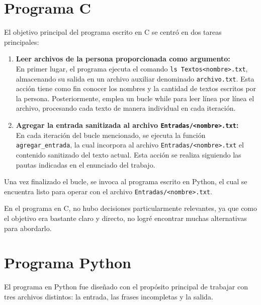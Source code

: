 \documentclass{article}
\begin{document}



\section{Programa C}
El objetivo principal del programa escrito en C se centró en dos tareas principales:

\begin{enumerate}
    \item \textbf{Leer archivos de la persona proporcionada como argumento:} \\
    En primer lugar, el programa ejecuta el comando \texttt{ls Textos<nombre>.txt}, almacenando su salida en un archivo auxiliar denominado
    \texttt{archivo.txt}. Esta acción tiene como fin conocer los nombres y la cantidad de textos escritos por la persona. Posteriormente, emplea un bucle while para leer línea por línea el archivo, procesando cada texto de manera individual en cada iteración.

    \item \textbf{Agregar la entrada sanitizada al archivo \texttt{Entradas/<nombre>.txt}:} \\
    En cada iteración del bucle mencionado, se ejecuta la función \texttt{agregar\_entrada}, la cual incorpora al archivo 
    \texttt{Entradas/<nombre>.txt} el contenido sanitizado del texto actual. Esta acción se realiza
     siguiendo las pautas indicadas en el enunciado del trabajo.
\end{enumerate}

Una vez finalizado el bucle, se invoca al programa escrito en Python, el cual se encuentra listo para operar
 con el archivo \texttt{Entradas/<nombre>.txt}.

En el programa en C, no hubo decisiones particularmente relevantes, ya que como el objetivo era bastante claro y directo, no logré encontrar muchas alternativas para abordarlo.

\section{Programa Python}
El programa en Python fue diseñado con el propósito principal de trabajar con tres archivos distintos: la entrada, las frases incompletas y la salida.
\end{document}
